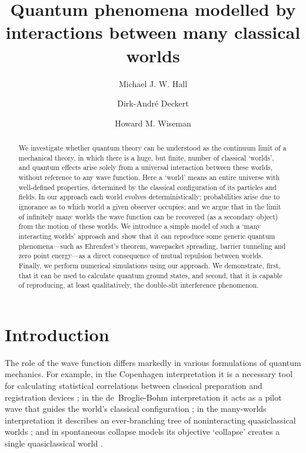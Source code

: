 \documentclass[twocolumn,aps,pra,amsmath,amssymb,superscriptaddress]{revtex4}
\renewcommand{\(}{\left(}
\renewcommand{\)}{\right)}
\newcommand{\blk}{\color{black}}
\begin{document}
\title{Quantum phenomena modelled by interactions between many classical worlds}  
\author{Michael J. W. Hall} 
\author{Dirk-Andr\'e Deckert}
\author{Howard M. Wiseman}


\begin{abstract}
    We investigate whether quantum theory can be understood as the continuum
    limit of a mechanical  theory, in which there is a huge, but finite, number
    of classical `worlds', and quantum effects arise solely from a universal
    interaction between these \blk 
    worlds, without reference to any wave function.  Here a `world' means an
    entire universe with well-defined properties, determined by the classical
    configuration of its  particles and fields.  
    In  our approach each world evolves deterministically; probabilities arise
    due to ignorance as to which world a given observer occupies;  and we argue
    that in the limit of infinitely many worlds the wave function can be
    recovered (as a secondary object) \blk from the motion of these worlds.  We 
    introduce a simple model of such \blk a `many interacting worlds' approach 
    and show \blk that it can reproduce some
    generic quantum phenomena---such as Ehrenfest's theorem, wavepacket
    spreading, barrier tunneling and zero point energy---as a direct consequence
    of mutual repulsion between worlds. 
    Finally,  we perform numerical simulations using our approach. We demonstrate, first,
    that it can be used to calculate \blk 
    quantum ground states, \blk and second,
    that it is capable of  reproducing, at least qualitatively, the double-slit \blk interference phenomenon. \blk
\end{abstract}


\maketitle


\section{Introduction}

The role of the wave function differs markedly in various formulations of
quantum mechanics.  For example, in the Copenhagen  interpretation it is a
necessary tool for calculating statistical correlations between \blk {\em a
priori} \blk classical preparation and registration devices \cite{copenhagen};
in the de~Broglie-Bohm interpretation it acts as a pilot wave that guides the
\blk world's classical \blk configuration \cite{dbb}; in the
many-worlds interpretation it describes an ever-branching tree of noninteracting
\blk quasiclassical \blk worlds \cite{mwi}; and in spontaneous collapse models
its objective `collapse' \blk creates a single quasiclassical world \blk 
\cite{grw}.  
\end{document}
